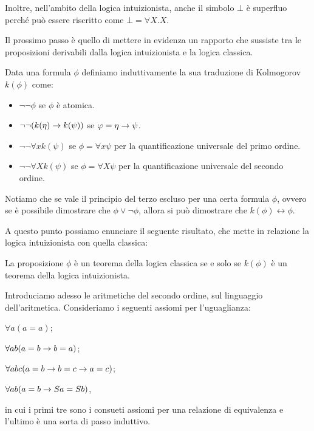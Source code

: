 \documentclass[]{marticle}
\begin{document}
Inoltre, nell'ambito della logica intuizionista, anche il simbolo $\bot$ \`e
superfluo perch\'e pu\`o essere riscritto come $\bot = \forall X.X$.

Il prossimo passo \`e quello di mettere in evidenza un rapporto che sussiste tra
le proposizioni derivabili dalla logica intuizionista e la logica classica.
\begin{block}[Definizione]
    Data una formula $\phi$ definiamo induttivamente la sua traduzione di
    Kolmogorov $k(\phi)$ come:
    \begin{itemize}
        \item $\lnot\lnot \phi$ se $\phi$ \`e atomica.
        \item $\lnot\lnot(k(\eta)\rightarrow k(\psi))$ se $\varphi=\eta\rightarrow\psi$.
        \item $\lnot\lnot \forall x k(\psi)$ se $\phi = \forall x \psi$ per la
            quantificazione universale del primo ordine.
        \item $\lnot\lnot \forall X k(\psi)$ se $\phi = \forall X \psi$ per la
            quantificazione universale del secondo ordine.
    \end{itemize}
\end{block}

Notiamo che se vale il principio del terzo escluso per una certa formula $\phi$,
ovvero se \`e possibile dimostrare che $\phi\lor\lnot\phi$, allora si pu\`o
dimostrare che $k(\phi)\leftrightarrow\phi$.

A questo punto possiamo enunciare il seguente risultato, che mette in relazione
la logica intuizionista con quella classica:
\begin{block}[Proposizione]
    La proposizione $\phi$ \`e un teorema della logica classica se e solo se
    $k(\phi)$ \`e un teorema della logica intuizionista.
\end{block}

Introduciamo adesso le aritmetiche del secondo ordine, sul linguaggio
dell'aritmetica. 
Consideriamo i seguenti assiomi per l'uguaglianza:
\begin{nlist}[U1]
    \item $\forall a (a=a)$;
    \item $\forall ab (a=b\rightarrow b=a)$;
    \item $\forall abc (a=b \rightarrow b=c \rightarrow a=c)$;
    \item $\forall ab(a=b \rightarrow Sa = Sb)$,
\end{nlist}
in cui i primi tre sono i consueti assiomi per una relazione di equivalenza e
l'ultimo \`e una sorta di passo induttivo.
\end{document}
